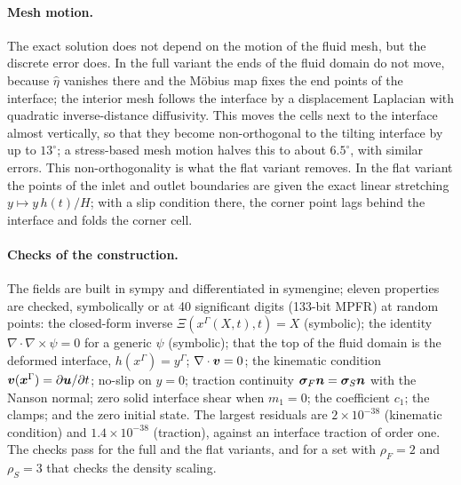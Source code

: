 \paragraph{Mesh motion.}
The exact solution does not depend on the motion of the fluid mesh, but the discrete error does.
In the full variant the ends of the fluid domain do not move, because $\hat\eta$ vanishes there and the M\"obius map fixes the end points of the interface; the interior mesh follows the interface by a displacement Laplacian with quadratic inverse-distance diffusivity.
This moves the cells next to the interface almost vertically, so that they become non-orthogonal to the tilting interface by up to $13^\circ$; a stress-based mesh motion halves this to about $6.5^\circ$, with similar errors.
This non-orthogonality is what the flat variant removes.
In the flat variant the points of the inlet and outlet boundaries are given the exact linear stretching $y \mapsto y\,h(t)/H$; with a slip condition there, the corner point lags behind the interface and folds the corner cell.

\paragraph{Checks of the construction.}
The fields are built in sympy and differentiated in symengine; eleven properties are checked, symbolically or at 40 significant digits (133-bit MPFR) at random points: the closed-form inverse $\Xi(x^\Gamma(X,t),t) = X$ (symbolic); the identity $\nabla\cdot\nabla\times\psi = 0$ for a generic $\psi$ (symbolic); that the top of the fluid domain is the deformed interface, $h(x^\Gamma) = y^\Gamma$; $\nabla\cdot\boldsymbol{v} = 0$; the kinematic condition $\boldsymbol{v}(\boldsymbol{x}^\Gamma) = \partial\boldsymbol{u}/\partial t$; no-slip on $y = 0$; traction continuity $\boldsymbol{\sigma}_F\boldsymbol{n} = \boldsymbol{\sigma}_S\boldsymbol{n}$ with the Nanson normal; zero solid interface shear when $m_1 = 0$; the coefficient $c_1$; the clamps; and the zero initial state.
The largest residuals are $2\times10^{-38}$ (kinematic condition) and $1.4\times10^{-38}$ (traction), against an interface traction of order one.
The checks pass for the full and the flat variants, and for a set with $\rho_F = 2$ and $\rho_S = 3$ that checks the density scaling.

